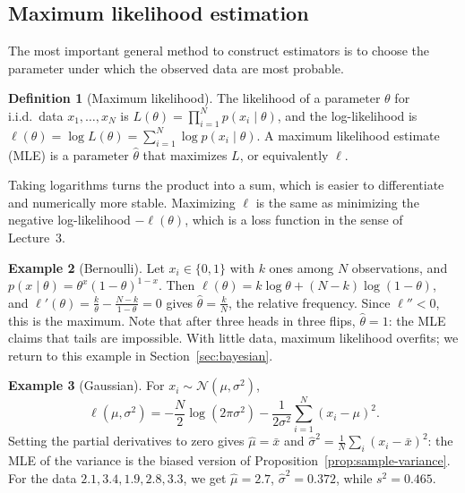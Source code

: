 \documentclass[11pt]{article}
\theoremstyle{definition}
\newtheorem{definition}{Definition}[section]
\newtheorem{example}[definition]{Example}
\theoremstyle{plain}
\theoremstyle{remark}
\begin{document}
\subsection{Maximum likelihood estimation}

The most important general method to construct estimators is to choose the parameter under which the observed data are most probable.

\begin{definition}[Maximum likelihood]\label{def:mle}
    The likelihood of a parameter $\theta$ for i.i.d.\ data $x_1, \ldots, x_N$ is $L(\theta) = \prod_{i=1}^N p(x_i \mid \theta)$, and the log-likelihood is $\ell(\theta) = \log L(\theta) = \sum_{i=1}^N \log p(x_i \mid \theta)$. A maximum likelihood estimate (MLE) is a parameter $\hat\theta$ that maximizes $L$, or equivalently $\ell$.
\end{definition}

Taking logarithms turns the product into a sum, which is easier to differentiate and numerically more stable. Maximizing $\ell$ is the same as minimizing the negative log-likelihood $-\ell(\theta)$, which is a loss function in the sense of Lecture~3.

\begin{example}[Bernoulli]\label{ex:mle-bernoulli}
    Let $x_i \in \{0, 1\}$ with $k$ ones among $N$ observations, and $p(x \mid \theta) = \theta^x(1 - \theta)^{1 - x}$. Then $\ell(\theta) = k\log\theta + (N - k)\log(1 - \theta)$, and $\ell'(\theta) = \frac{k}{\theta} - \frac{N - k}{1 - \theta} = 0$ gives $\hat\theta = \frac{k}{N}$, the relative frequency. Since $\ell'' < 0$, this is the maximum. Note that after three heads in three flips, $\hat\theta = 1$: the MLE claims that tails are impossible. With little data, maximum likelihood overfits; we return to this example in Section~\ref{sec:bayesian}.
\end{example}

\begin{example}[Gaussian]\label{ex:mle-gaussian}
    For $x_i \sim \mathcal{N}(\mu, \sigma^2)$,
    \[\ell(\mu, \sigma^2) = -\frac{N}{2}\log(2\pi\sigma^2) - \frac{1}{2\sigma^2}\sum_{i=1}^N (x_i - \mu)^2.\]
    Setting the partial derivatives to zero gives $\hat\mu = \bar x$ and $\hat\sigma^2 = \frac{1}{N}\sum_i (x_i - \bar x)^2$: the MLE of the variance is the biased version of Proposition~\ref{prop:sample-variance}. For the data $2.1, 3.4, 1.9, 2.8, 3.3$, we get $\hat\mu = 2.7$, $\hat\sigma^2 = 0.372$, while $s^2 = 0.465$.
\end{example}
\end{document}
